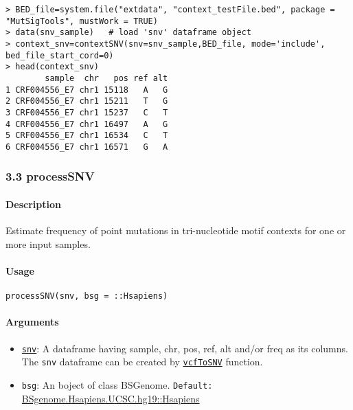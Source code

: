 \documentclass[]{article}
\providecommand{\tightlist}{%
  \setlength{\itemsep}{0pt}\setlength{\parskip}{0pt}}
\let\oldparagraph\paragraph
\renewcommand{\paragraph}[1]{\oldparagraph{#1}\mbox{}}
\begin{document}
\begin{verbatim}
> BED_file=system.file("extdata", "context_testFile.bed", package = "MutSigTools", mustWork = TRUE)
> data(snv_sample)   # load 'snv' dataframe object
> context_snv=contextSNV(snv=snv_sample,BED_file, mode='include', bed_file_start_cord=0)
> head(context_snv)
        sample  chr   pos ref alt
1 CRF004556_E7 chr1 15118   A   G
2 CRF004556_E7 chr1 15211   T   G
3 CRF004556_E7 chr1 15237   C   T
4 CRF004556_E7 chr1 16497   A   G
5 CRF004556_E7 chr1 16534   C   T
6 CRF004556_E7 chr1 16571   G   A
\end{verbatim}

\subsubsection{3.3 processSNV}\label{processsnv}

\paragraph{\texorpdfstring{\textbf{Description}}{Description}}\label{description-2}

Estimate frequency of point mutations in tri-nucleotide motif contexts for one or more input samples.


\paragraph{\texorpdfstring{\textbf{Usage}}{Usage}}\label{usage-2}

\texttt{processSNV(snv,\ bsg\ =\ ::Hsapiens)}

\paragraph{\texorpdfstring{\textbf{Arguments
}}{Arguments }}\label{arguments-2}

\begin{itemize}
\tightlist
\item
  \protect\hyperlink{snv}{\texttt{snv}}: A dataframe having sample, chr,
  pos, ref, alt and/or freq as its columns. The \texttt{snv} dataframe
  can be created by \protect\hyperlink{vcfToSNV}{\texttt{vcfToSNV}}
  function.
\item
  \texttt{bsg}: An boject of class BSGenome. \texttt{Default:}
  \href{https://bioconductor.org/packages/release/data/annotation/html/BSgenome.Hsapiens.UCSC.hg19.html}{BSgenome.Hsapiens.UCSC.hg19::Hsapiens}
\end{itemize}
\end{document}
